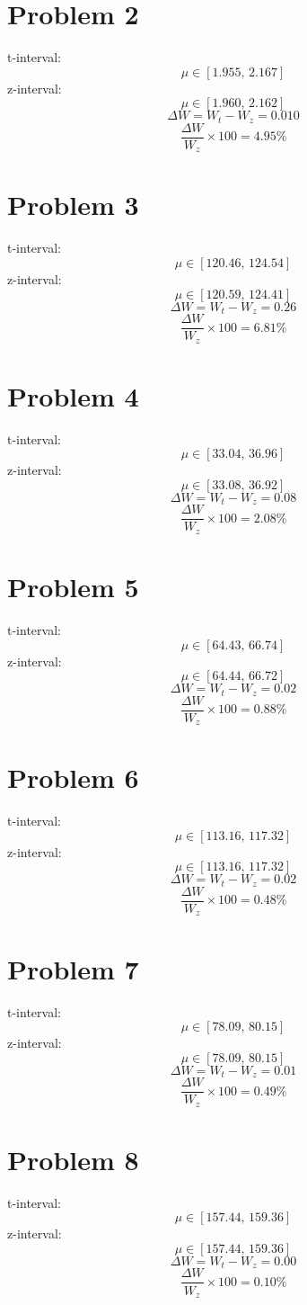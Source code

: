 	\section{Problem 2}
	t-interval:
	\[
	\mu \in [1.955,\,2.167]
	\]
	z-interval:
	\[
	\mu \in [1.960,\,2.162]
	\]
	\[
	\Delta W = W_t - W_z = 0.010
	\]
	\[
	\frac{\Delta W}{W_z}\times 100 = 4.95\%
	\]

	\section{Problem 3}
	t-interval:
	\[
	\mu \in [120.46,\,124.54]
	\]
	z-interval:
	\[
	\mu \in [120.59,\,124.41]
	\]
	\[
	\Delta W = W_t - W_z = 0.26
	\]
	\[
	\frac{\Delta W}{W_z}\times 100 = 6.81\%
	\]

	\section{Problem 4}
	t-interval:
	\[
	\mu \in [33.04,\,36.96]
	\]
	z-interval:
	\[
	\mu \in [33.08,\,36.92]
	\]
	\[
	\Delta W = W_t - W_z = 0.08
	\]
	\[
	\frac{\Delta W}{W_z}\times 100 = 2.08\%
	\]

	\section{Problem 5}
	t-interval:
	\[
	\mu \in [64.43,\,66.74]
	\]
	z-interval:
	\[
	\mu \in [64.44,\,66.72]
	\]
	\[
	\Delta W = W_t - W_z = 0.02
	\]
	\[
	\frac{\Delta W}{W_z}\times 100 = 0.88\%
	\]

	\section{Problem 6}
	t-interval:
	\[
	\mu \in [113.16,\,117.32]
	\]
	z-interval:
	\[
	\mu \in [113.16,\,117.32]
	\]
	\[
	\Delta W = W_t - W_z = 0.02
	\]
	\[
	\frac{\Delta W}{W_z}\times 100 = 0.48\%
	\]

	\section{Problem 7}
	t-interval:
	\[
	\mu \in [78.09,\,80.15]
	\]
	z-interval:
	\[
	\mu \in [78.09,\,80.15]
	\]
	\[
	\Delta W = W_t - W_z = 0.01
	\]
	\[
	\frac{\Delta W}{W_z}\times 100 = 0.49\%
	\]

	\section{Problem 8}
	t-interval:
	\[
	\mu \in [157.44,\,159.36]
	\]
	z-interval:
	\[
	\mu \in [157.44,\,159.36]
	\]
	\[
	\Delta W = W_t - W_z = 0.00
	\]
	\[
	\frac{\Delta W}{W_z}\times 100 = 0.10\%
	\]


